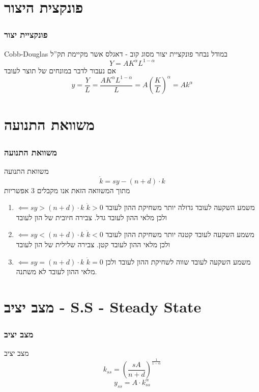 \documentclass[usenames,dvipsnames]{beamer}
\begin{document}
\begin{RTL}
\begin{frame}[allowframebreaks]
\end{frame}


\section{פונקצית היצור}
\begin{frame}
    \frametitle{פונקציית יצור}
    \begin{block}{Cobb-Douglas}
        במודל נבחר פונקציית יצור מסוג קוב - דאגלס אשר מקיימת תק''ל
        \[Y = A K^\alpha L ^{1-\alpha}\]
        אם נעבור לדבר במונחים של תוצר לעובד
        \[y = \frac{Y}{L} = \frac{ A K^\alpha L ^{1-\alpha}}{L} = A \left (\frac{K}{L} \right )^\alpha = A k^\alpha\]
    \end{block}
\end{frame}

\section{משוואת התנועה}

\begin{frame}
    \frametitle{משוואת התנועה}
    \begin{block}{משוואת התנועה}
        \begin{equation*}
            \dot k = sy - (n+d)\cdot k
        \end{equation*}
        מתוך המשוואה הזאת אנו מקבלים 3 אפשריות
        \begin{enumerate}
            \item $\impliedby sy > (n+d) \cdot k  $ $\dot k > 0$ משמע השקעה לעובד גדולה יותר משחיקת ההון לעובד ולכן מלאי ההון לעובד גדל. צבירה חיובית של הון לעובד
            \item $\impliedby sy < (n+d) \cdot k  $ $\dot k < 0$ משמע השקעה לעובד קטנה יותר משחיקת ההון לעובד ולכן מלאי ההון לעובד קטן. צבירה שלילית של הון לעובד
            \item $\impliedby sy = (n+d) \cdot k  $ $\dot k = 0$ משמע השקעה לעובד שווה לשחיקת ההון לעובד ולכן מלאי ההון לעובד לא משתנה.
        \end{enumerate}
    \end{block}
\end{frame}



\section{מצב יציב - S.S - Steady State}
\begin{frame}[allowframebreaks]
    \frametitle{מצב יציב}
    \begin{block}{מצב יציב}
        \begin{equation}
            k_{ss} = \left(\frac{sA}{n+d}\right) ^ {\frac{1}{1-\alpha}}
        \end{equation}
        \begin{equation}
            y_{ss} = A \cdot k_{ss}^\alpha
        \end{equation}
        

\end{block}
\end{frame}
\end{RTL}
\end{document}
